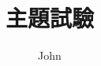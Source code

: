 \documentclass{beamer}
\title{主題試驗}
\author{John}
\begin{document}
\begin{frame}
\titlepage
\end{frame}
\end{document}
